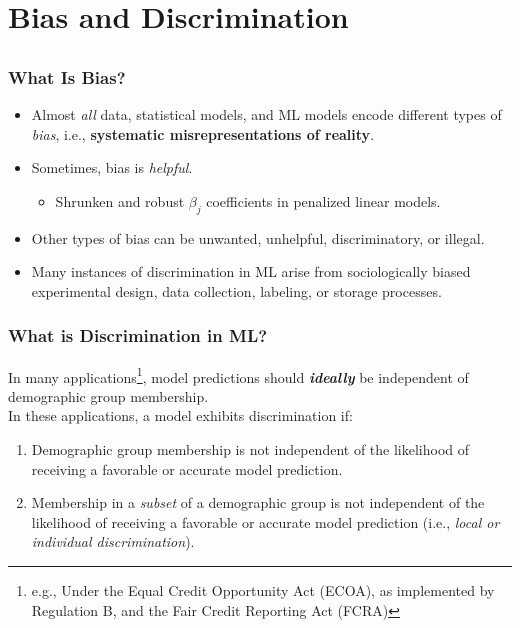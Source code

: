 \documentclass[11pt,aspectratio=169,hyperref={colorlinks}]{beamer}
\begin{document}
	\section{Bias and Discrimination}
	
		\subsection*{}
	
		\begin{frame}
		
			\frametitle{What Is Bias?}			
					
			\begin{itemize}
			\item Almost \textit{all} data, statistical models, and ML models encode different types of \textit{bias}, i.e., \textbf{systematic misrepresentations of reality}.\\
			\item Sometimes, bias is \textit{helpful}.
				\begin{itemize}
					\item{Shrunken and robust $\beta_j$ coefficients in penalized linear models.}	\end{itemize}
			\item Other types of bias can be unwanted, unhelpful, discriminatory, or illegal. 
			\item Many instances of discrimination in ML arise from sociologically biased experimental design, data collection, labeling, or storage processes.
			\end{itemize}
					
		\end{frame}					
		
		\begin{frame}				
			
			\frametitle{What is Discrimination in ML?}
			
			\noindent In many applications\footnote{\small{e.g., Under the Equal Credit Opportunity Act (ECOA), as implemented by Regulation B, and the Fair Credit Reporting Act (FCRA})}, model predictions should \textbf{\textit{ideally}} be independent of demographic group membership.\\
			\vspace{5pt}
			\noindent In these applications, a model exhibits discrimination if:
			\begin{enumerate}
				\item Demographic group membership is not independent of the likelihood of receiving a favorable or accurate model prediction.
				\item Membership in a \textit{subset} of a demographic group is not independent of the likelihood of receiving a favorable or accurate model prediction (i.e., \textit{local or individual discrimination}).\cite{hall2019guidelines}
			\end{enumerate}
		
		\end{frame}
		
\end{document}
